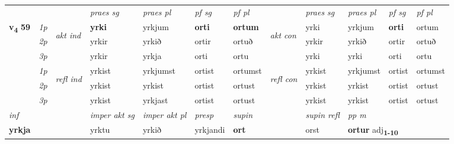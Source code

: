 \begin{longtable}[l]{X>{\footnotesize\itshape}llXXXXlXXXX}
 & &   & \textit{praes sg}  & \textit{praes pl}    & \textit{ pf sg} & \textit{pf pl} & & \textit{praes sg}  & \textit{praes pl}    & \textit{pf sg} & \textit{pf pl }  \\ \cmidrule{4-7} \cmidrule{9-12}
 \multirow{2}{*}{{{\textbf{v{\textsubscript{4}}} \Large{\textbf{59}}}}}  & 1p & \multirow{3}{*}{\begin{turn}{90}\textit{akt ind}\end{turn}} & \textbf{yrki} & yrkjum & \textbf{orti} & \textbf{ortum} & \multirow{3}{*}{\begin{turn}{90}\textit{akt con}\end{turn}} &yrki & yrkjum & \textbf{orti} & ortum\\*
 & 2p &  &  yrkir  & yrkið & ortir & ortuð & & yrkir & yrkið & ortir & ortuð \\*
 & 3p &  & yrkir & yrkja & orti & ortu & & yrki & yrki& orti & ortu \\*
\cmidrule{4-7} \cmidrule{9-12}
 & 1p & \multirow{3}{*}{\begin{turn}{90}\textit{refl ind}\end{turn}}  & yrkist & yrkjumst & ortist & ortumst & \multirow{3}{*}{\begin{turn}{90}\textit{refl con}\end{turn}}  &yrkist & yrkjumst & ortist & ortumst \\*
 & 2p &  & yrkist & yrkist & ortist & ortust & &yrkist & yrkist & ortist & ortust \\*
 & 3p  & & yrkist & yrkjast & ortist & ortust & & yrkist & yrkist& ortist & ortust \\*
\cmidrule{4-7} \cmidrule{9-12}

   {\textit{inf}} & &  & \textit{imper akt sg} & \textit{imper akt pl}   & \textit{presp} & \textit{supin} && \textit{supin refl} & \textit{pp m} \\*
  {\textbf{yrkja}} & && yrktu  & yrkið   & yrkjandi &  \textbf{ort} && orst & \multicolumn{2}{l}{\textbf{ortur} adj\textbf{\textsubscript{1-10}}} \\*


\end{longtable}
